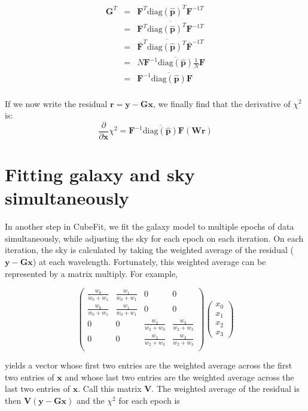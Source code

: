 \documentclass[12pt]{article}
\newcommand{\G}{\mathbf{G}}
\newcommand{\phat}{\mathbf{\hat p}}
\newcommand{\x}{\mathbf{x}}
\newcommand{\y}{\mathbf{y}}
\newcommand{\rvect}{\mathbf{r}}
\newcommand{\W}{\mathbf{W}}
\newcommand{\F}{\mathbf{F}}
\newcommand{\V}{\mathbf{V}}
\newcommand{\diag}{\mathrm{diag}}
\newcommand{\ddx}{\frac{\partial}{\partial \mathbf{x}}}
\begin{document}
\begin{eqnarray*}
  \G^{T} & = & \F^{T} \diag(\phat)^{T} \F^{-1T}\\
        & = & \overline{\F^{T} \diag(\phat)^{T} \F^{-1T}} \\
        & = & \bar{\F}^T \overline{\diag(\phat)^T} \bar{\F}^{-1T} \\
        & = & N\F^{-1} \overline{\diag(\phat)} \frac{1}{N}\F \\
        & = & \F^{-1} \overline{\diag(\phat)} \F\\
\end{eqnarray*}

If we now write the residual $\rvect = \y - \G\x$, we finally find that the
derivative of $\chi^{2}$ is:
\begin{equation}
  \ddx \chi^{2} = \F^{-1} \overline{\diag(\phat)} \F(\W \rvect)
\end{equation}


\section{Fitting galaxy and sky simultaneously}

In another step in CubeFit, we fit the galaxy model to multiple epochs
of data simultaneously, while adjusting the sky for each epoch on each
iteration.  On each iteration, the sky is calculated by taking the
weighted average of the residual ($\y - \G \x$) at each wavelength.
Fortunately, this weighted average can be represented by a
matrix multiply. For example,

\begin{equation}
  \left( \begin{array}{cccc}
   \frac{w_0}{w_0 + w_1} & \frac{w_1}{w_0 + w_1} & 0 & 0 \\
   \frac{w_0}{w_0 + w_1} & \frac{w_1}{w_0 + w_1} & 0 & 0 \\
   0   & 0   & \frac{w_2}{w_2 + w_3} & \frac{w_3}{w_2 + w_3} \\
   0   & 0   & \frac{w_2}{w_2 + w_3} & \frac{w_3}{w_2 + w_3} \\
   \end{array} \right)
   \left( \begin{array}{c} x_0 \\ x_1 \\ x_2 \\ x_3 \end{array} \right)
\end{equation}

\noindent yields a vector whose first two entries are the weighted
average across the first two entries of $\x$ and whose last two
entries are the weighted average across the last two entries of
$\x$. Call this matrix $\V$. The weighted average of the residual is then
$\V (\y - \G\x)$ and the $\chi^2$ for each epoch is
\end{document}
